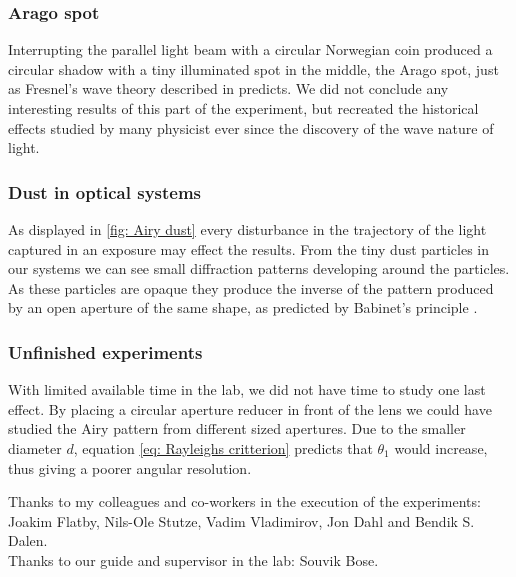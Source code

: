 \documentclass{emulateapj}
\begin{document}
\subsubsection{Arago spot}
Interrupting the parallel light beam with a circular Norwegian coin produced a circular shadow with a tiny illuminated spot in the middle, the Arago spot, just as Fresnel's wave theory described in \citep{wiki:Arago} predicts. We did not conclude any interesting results of this part of the experiment, but recreated the historical effects studied by many physicist ever since the discovery of the wave nature of light.

\subsubsection{Dust in optical systems}
As displayed in \cref{fig: Airy dust} every disturbance in the trajectory of the light captured in an exposure may effect the results. From the tiny dust particles in our systems we can see small diffraction patterns developing around the particles. As these particles are opaque they produce the inverse of the pattern produced by an open aperture of the same shape, as predicted by Babinet's principle \citep{swaves}.

\subsubsection{Unfinished experiments}
With limited available time in the lab, we did not have time to study one last effect. By placing a circular aperture reducer in front of the lens we could have studied the Airy pattern from different sized apertures. Due to the smaller diameter $d$, equation \cref{eq: Rayleighs critterion} predicts that $\theta_{1}$ would increase, thus giving a poorer angular resolution.

\begin{acknowledgements}
Thanks to my colleagues and co-workers in the execution of the experiments: Joakim Flatby, Nils-Ole Stutze, Vadim Vladimirov, Jon Dahl and Bendik S. Dalen.\\
Thanks to our guide and supervisor in the lab: Souvik Bose.
\end{acknowledgements}
\end{document}
